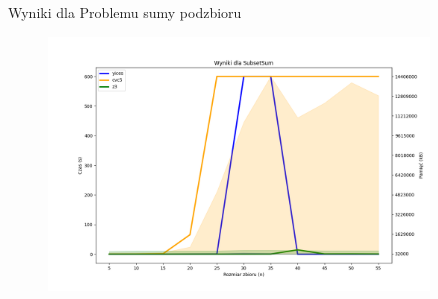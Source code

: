 \begin{frame}{Wyniki dla Problemu sumy podzbioru}
	\begin{figure}[htbp]
		\includegraphics[width={0.9\textwidth}]{../thesis/figures/8-plot.png}
	\end{figure}
\end{frame}
	